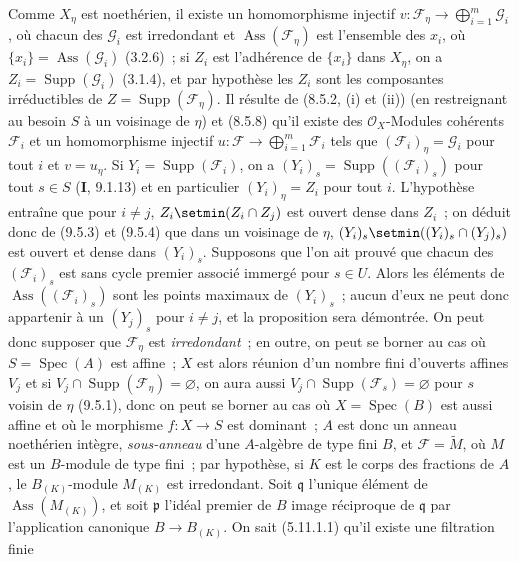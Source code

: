 Comme $X_\eta$ est noethérien, il existe un homomorphisme injectif
$v:\mathcal F_\eta\to\bigoplus_{i=1}^m\mathcal G_i$, où chacun des $\mathcal G_i$ est
irredondant et $\operatorname{Ass}(\mathcal F_\eta)$ est l'ensemble des $x_i$, où
$\{x_i\}=\operatorname{Ass}(\mathcal G_i)$ (3.2.6)~; si $Z_i$ est l'adhérence de
$\{x_i\}$ dans $X_\eta$, on a $Z_i=\operatorname{Supp}(\mathcal G_i)$ (3.1.4), et
par hypothèse les $Z_i$ sont les composantes irréductibles de
$Z=\operatorname{Supp}(\mathcal F_\eta)$. Il résulte de (8.5.2, (i) et (ii)) (en
restreignant au besoin $S$ à un voisinage de $\eta$) et (8.5.8) qu'il existe des
$\mathcal O_X$-Modules cohérents $\mathcal F_i$ et un homomorphisme injectif
$u:\mathcal F\to\bigoplus_{i=1}^m\mathcal F_i$ tels que $(\mathcal F_i)_\eta=\mathcal G_i$ pour
tout $i$ et $v=u_\eta$. Si $Y_i=\operatorname{Supp}(\mathcal F_i)$, on a
$(Y_i)_s=\operatorname{Supp}((\mathcal F_i)_s)$ pour tout $s\in S$
(\textbf{I}, 9.1.13) et en particulier $(Y_i)_\eta=Z_i$ pour tout $i$.
L'hypothèse entraîne que pour $i\neq j$, $Z_i\setmin(Z_i\cap Z_j)$ est ouvert dense
dans $Z_i$~; on déduit donc de (9.5.3) et (9.5.4) que dans un voisinage de
$\eta$, $(Y_i)_s\setmin((Y_i)_s\cap(Y_j)_s)$ est ouvert et dense dans $(Y_i)_s$.
Supposons que l'on ait prouvé que chacun des $(\mathcal F_i)_s$ est sans cycle
premier associé immergé pour $s\in U$. Alors les éléments de
$\operatorname{Ass}((\mathcal F_i)_s)$ sont les points maximaux de $(Y_i)_s$~;
aucun d'eux ne peut donc appartenir à un $(Y_j)_s$ pour $i\neq j$, et la
proposition sera démontrée. On peut donc supposer que $\mathcal F_\eta$ est
\emph{irredondant}~; en outre, on peut se borner au cas où
$S=\operatorname{Spec}(A)$ est affine~; $X$ est alors réunion d'un nombre fini
d'ouverts affines $V_j$ et si $V_j\cap\operatorname{Supp}(\mathcal F_\eta)
=\varnothing$, on aura aussi $V_j\cap\operatorname{Supp}(\mathcal F_s)=\varnothing$
pour $s$ voisin de $\eta$ (9.5.1), donc on peut se borner au cas où
$X=\operatorname{Spec}(B)$ est aussi affine et où le morphisme $f:X\to S$ est
dominant~; $A$ est donc un anneau noethérien intègre, \emph{sous-anneau} d'une
$A$-algèbre de type fini $B$, et $\mathcal F=\widetilde M$, où $M$ est un
$B$-module de type fini~; par hypothèse, si $K$ est le corps des fractions de
$A$, le $B_{(K)}$-module $M_{(K)}$ est irredondant. Soit $\mathfrak q$ l'unique
élément de $\operatorname{Ass}(M_{(K)})$, et soit $\mathfrak p$ l'idéal premier
de $B$ image réciproque de $\mathfrak q$ par l'application canonique
$B\to B_{(K)}$. On sait (5.11.1.1) qu'il existe une filtration finie
